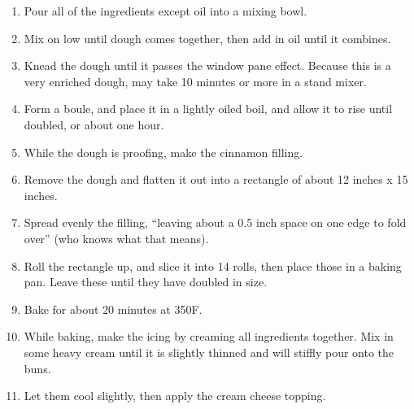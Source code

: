\documentclass[12pt]{article}
\begin{document}
\begin{multicols*}{2}
\begin{enumerate}
    \item Pour all of the ingredients except oil into a mixing bowl.
    \item Mix on low until dough comes together, then add in oil until it combines.
    \item Knead the dough until it passes the window pane effect. Because this is a very enriched dough, may take 10 minutes or more in a stand mixer.
    \item Form a boule, and place it in a lightly oiled boil, and allow it to rise until doubled, or about one hour.
    \item While the dough is proofing, make the cinnamon filling.
    \item Remove the dough and flatten it out into a rectangle of about 12 inches x 15 inches.
    \item Spread evenly the filling, ``leaving about a 0.5 inch space on one edge to fold over'' (who knows what that means).
    \item Roll the rectangle up, and slice it into 14 rolls, then place those in a baking pan. Leave these until they have doubled in size.
    \item Bake for about 20 minutes at 350F.
    \item While baking, make the icing by creaming all ingredients together. Mix in some heavy cream until it is slightly thinned and will stiffly pour onto the buns.
    \item Let them cool slightly, then apply the cream cheese topping.
\end{enumerate}

\end{multicols*}
\end{document}
